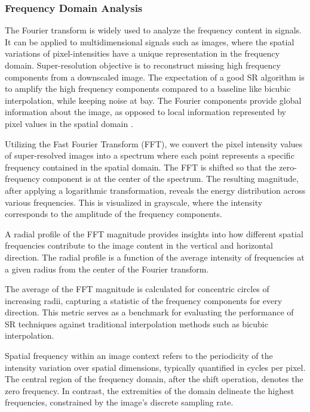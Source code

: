         \subsubsection{Frequency Domain Analysis} \label{subsubsec:frequency_domain_analysis}
        
        The Fourier transform is widely used to analyze the frequency content in signals.  It can be applied to multidimensional signals such as images, where the spatial variations of pixel-intensities have a unique representation in the frequency domain. Super-resolution objective is to reconstruct missing high frequency components from a downscaled image. The expectation of a good SR algorithm is to amplify the high frequency components compared to a baseline like bicubic interpolation, while keeping noise at bay. The Fourier components provide global information about the image, as opposed to local information represented by pixel values in the spatial domain \cite{fuoli2021fourier}. 

        
        Utilizing the Fast Fourier Transform (FFT), we convert the pixel intensity values of super-resolved images into a spectrum where each point represents a specific frequency contained in the spatial domain. The FFT is shifted so that the zero-frequency component is at the center of the spectrum. The resulting magnitude, after applying a logarithmic transformation, reveals the energy distribution across various frequencies. This is visualized in grayscale, where the intensity corresponds to the amplitude of the frequency components.
        
        A radial profile of the FFT magnitude provides insights into how different spatial frequencies contribute to the image content in the vertical and horizontal direction. The radial profile is a function of the average intensity of frequencies at a given radius from the center of the Fourier transform.
        
        The average of the FFT magnitude is calculated for concentric circles of increasing radii, capturing a statistic of the frequency components for every direction. This metric serves as a benchmark for evaluating the performance of SR techniques against traditional interpolation methods such as bicubic interpolation.

        Spatial frequency within an image context refers to the periodicity of the intensity variation over spatial dimensions, typically quantified in cycles per pixel. The central region of the frequency domain, after the shift operation, denotes the zero frequency. In contrast, the extremities of the domain delineate the highest frequencies, constrained by the image's discrete sampling rate.

